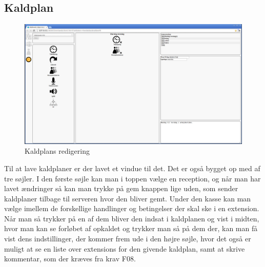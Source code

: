 \subsection{Kaldplan}
\begin{figure}[ht!]
\centering
\includegraphics[width=\textwidth]{images/screen_dialplan.png}
\caption{Kaldplans redigering}
\label{fig:screendialplan}
\end{figure}
Til at lave kaldplaner er der lavet et vindue til det. Det er også bygget op med af tre søjler. I den første søjle kan man i toppen vælge en reception, og når man har lavet ændringer så kan man trykke på gem knappen lige uden, som sender kaldplaner tilbage til serveren hvor den bliver gemt. Under den kasse kan man vælge imellem de forskellige handlinger og betingelser der skal ske i en extension. Når man så trykker på en af dem bliver den indsat i kaldplanen og vist i midten, hvor man kan se forløbet af opkaldet og trykker man så på dem der, kan man få vist dens indstillinger, der kommer frem ude i den højre søjle, hvor det også er muligt at se en liste over extensions for den givende kaldplan, samt at skrive kommentar, som der kræves fra krav F08.


%    
%
%

